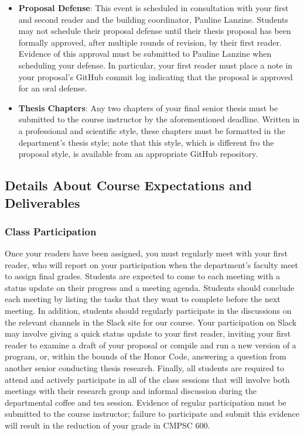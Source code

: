 \documentclass[11pt]{article}
\begin{document}
\begin{itemize}
  \item {\bf Proposal Defense}: This event is scheduled in consultation with
    your first and second reader and the building coordinator, Pauline Lanzine.
    Students may not schedule their proposal defense until their thesis proposal
    has been formally approved, after multiple rounds of revision, by their
    first reader. Evidence of this approval must be submitted to Pauline Lanzine
    when scheduling your defense. In particular, your first reader must place a
    note in your proposal's GitHub commit log indicating that the proposal is
    approved for an oral defense.

  \item {\bf Thesis Chapters}: Any two chapters of your final senior thesis must
    be submitted to the course instructor by the aforementioned deadline.
    Written in a professional and scientific style, these chapters must be
    formatted in the department's thesis style; note that this style, which is
    different fro the proposal style, is available from an appropriate GitHub
    repository.

\end{itemize}

\subsection*{Details About Course Expectations and Deliverables}

\subsubsection*{Class Participation}

Once your readers have been assigned, you must regularly meet with your first
reader, who will report on your participation when the department's faculty meet
to assign final grades.  Students are expected to come to each meeting with a
status update on their progress and a meeting agenda.  Students should conclude
each meeting by listing the tasks that they want to complete before the next
meeting. In addition, students should regularly participate in the discussions
on the relevant channels in the Slack site for our course. Your participation on
Slack may involve giving a quick status update to your first reader, inviting
your first reader to examine a draft of your proposal or compile and run a new
version of a program, or, within the bounds of the Honor Code, answering a
question from another senior conducting thesis research.  Finally, all students
are required to attend and actively participate in all of the class sessions
that will involve both meetings with their research group and informal
discussion during the departmental coffee and tea session. Evidence of regular
participation must be submitted to the course instructor; failure to participate
and submit this evidence will result in the reduction of your grade in CMPSC
600.
\end{document}
